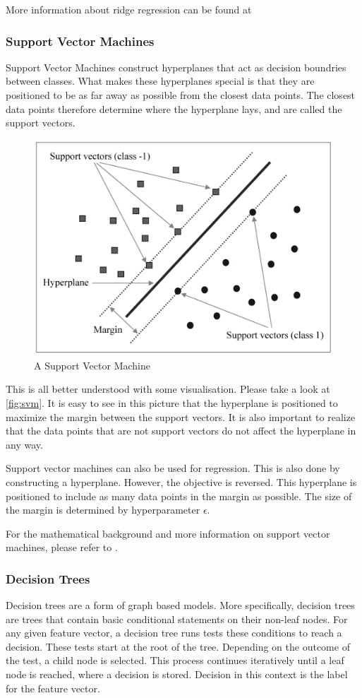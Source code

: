 More information about ridge regression can be found at \parencite{homl:4}

\subsubsection{Support Vector Machines}
Support Vector Machines construct hyperplanes that act as decision boundries between classes.
What makes these hyperplanes special is that they are positioned to be as far away as possible from the closest data points.
The closest data points therefore determine where the hyperplane lays, and are called the support vectors. \parencite{homl:5}

\begin{figure}
	\centering
	\includegraphics[width=0.5\linewidth]{figures/svm}
	\caption{A Support Vector Machine \parencite{svm_pic}}
	\label{fig:svm}
\end{figure}

This is all better understood with some visualisation. 
Please take a look at \autoref{fig:svm}.
It is easy to see in this picture that the hyperplane is positioned to maximize the margin between the support vectors.
It is also important to realize that the data points that are not support vectors do not affect the hyperplane in any way. \parencite{homl:5}

Support vector machines can also be used for regression.
This is also done by constructing a hyperplane.
However, the objective is reversed.
This hyperplane is positioned to include as many data points in the margin as possible.
The size of the margin is determined by hyperparameter $\epsilon$. \parencite{homl:5}

For the mathematical background and more information on support vector machines, please refer to \parencite{homl:5}.

\subsubsection{Decision Trees}
Decision trees are a form of graph based models.\parencite{ml:prml}
More specifically, decision trees are trees that contain basic conditional statements on their non-leaf nodes.
For any given feature vector, a decision tree runs tests these conditions to reach a decision.
These tests start at the root of the tree.
Depending on the outcome of the test, a child node is selected.
This process continues iteratively until a leaf node is reached, where a decision is stored.
Decision in this context is the label for the feature vector.\parencite{ai:ml}


